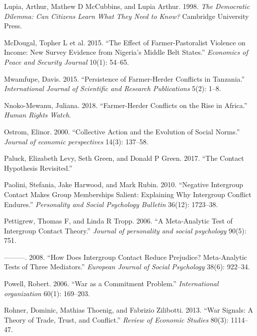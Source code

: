 \documentclass[11pt]{article}
\begin{document}
\leavevmode\hypertarget{ref-lupia1998democratic}{}%
Lupia, Arthur, Mathew D McCubbins, and Lupia Arthur. 1998. \emph{The
Democratic Dilemma: Can Citizens Learn What They Need to Know?}
Cambridge University Press.

\leavevmode\hypertarget{ref-mcdougal2015effect}{}%
McDougal, Topher L et al. 2015. ``The Effect of Farmer-Pastoralist
Violence on Income: New Survey Evidence from Nigeria's Middle Belt
States.'' \emph{Economics of Peace and Security Journal} 10(1): 54--65.

\leavevmode\hypertarget{ref-mwamfupe2015persistence}{}%
Mwamfupe, Davis. 2015. ``Persistence of Farmer-Herder Conflicts in
Tanzania.'' \emph{International Journal of Scientific and Research
Publications} 5(2): 1--8.

\leavevmode\hypertarget{ref-hrc2018farmer}{}%
Nnoko-Mewanu, Juliana. 2018. ``Farmer-Herder Conflicts on the Rise in
Africa.'' \emph{Human Rights Watch}.

\leavevmode\hypertarget{ref-ostrom2000collective}{}%
Ostrom, Elinor. 2000. ``Collective Action and the Evolution of Social
Norms.'' \emph{Journal of economic perspectives} 14(3): 137--58.

\leavevmode\hypertarget{ref-paluck2017contact}{}%
Paluck, Elizabeth Levy, Seth Green, and Donald P Green. 2017. ``The
Contact Hypothesis Revisited.''

\leavevmode\hypertarget{ref-paolini2010negative}{}%
Paolini, Stefania, Jake Harwood, and Mark Rubin. 2010. ``Negative
Intergroup Contact Makes Group Memberships Salient: Explaining Why
Intergroup Conflict Endures.'' \emph{Personality and Social Psychology
Bulletin} 36(12): 1723--38.

\leavevmode\hypertarget{ref-pettigrew2006meta}{}%
Pettigrew, Thomas F, and Linda R Tropp. 2006. ``A Meta-Analytic Test of
Intergroup Contact Theory.'' \emph{Journal of personality and social
psychology} 90(5): 751.

\leavevmode\hypertarget{ref-pettigrew2008does}{}%
---------. 2008. ``How Does Intergroup Contact Reduce Prejudice?
Meta-Analytic Tests of Three Mediators.'' \emph{European Journal of
Social Psychology} 38(6): 922--34.

\leavevmode\hypertarget{ref-powell2006war}{}%
Powell, Robert. 2006. ``War as a Commitment Problem.''
\emph{International organization} 60(1): 169--203.

\leavevmode\hypertarget{ref-rohner2013war}{}%
Rohner, Dominic, Mathias Thoenig, and Fabrizio Zilibotti. 2013. ``War
Signals: A Theory of Trade, Trust, and Conflict.'' \emph{Review of
Economic Studies} 80(3): 1114--47.
\end{document}
